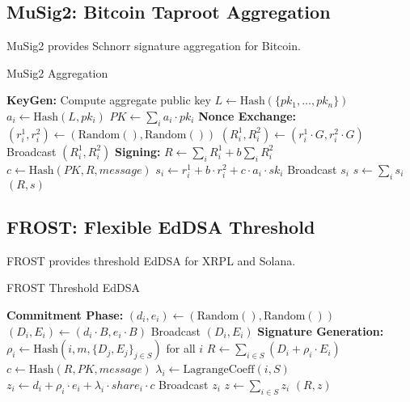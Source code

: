 \documentclass[11pt]{article}
\begin{document}
\subsection{MuSig2: Bitcoin Taproot Aggregation}

MuSig2 \cite{musig2} provides Schnorr signature aggregation for Bitcoin.

\begin{algorithm}[H]
\caption{MuSig2 Aggregation}
\begin{algorithmic}[1]
    \State \textbf{KeyGen:} Compute aggregate public key
    \State $L \gets \text{Hash}(\{pk_1, \ldots, pk_n\})$
        \State $a_i \gets \text{Hash}(L, pk_i)$
    \EndFor
    \State $PK \gets \sum_{i} a_i \cdot pk_i$
    \State
    \State \textbf{Nonce Exchange:}
        \State $(r_i^1, r_i^2) \gets (\text{Random}(), \text{Random}())$
        \State $(R_i^1, R_i^2) \gets (r_i^1 \cdot G, r_i^2 \cdot G)$
        \State Broadcast $(R_i^1, R_i^2)$
    \EndFor
    \State
    \State \textbf{Signing:}
    \State $R \gets \sum_{i} R_i^1 + b \sum_{i} R_i^2$ 
    \State $c \gets \text{Hash}(PK, R, message)$
        \State $s_i \gets r_i^1 + b \cdot r_i^2 + c \cdot a_i \cdot sk_i$
        \State Broadcast $s_i$
    \EndFor
    \State $s \gets \sum_i s_i$
    \State \Return $(R, s)$ 
\EndFunction
\end{algorithmic}
\end{algorithm}

\subsection{FROST: Flexible EdDSA Threshold}

FROST \cite{frost} provides threshold EdDSA for XRPL and Solana.

\begin{algorithm}[H]
\caption{FROST Threshold EdDSA}
\begin{algorithmic}[1]
    \State \textbf{Commitment Phase:}
        \State $(d_i, e_i) \gets (\text{Random}(), \text{Random}())$
        \State $(D_i, E_i) \gets (d_i \cdot B, e_i \cdot B)$ 
        \State Broadcast $(D_i, E_i)$
    \EndFor
    \State
    \State \textbf{Signature Generation:}
    \State $\rho_i \gets \text{Hash}(i, m, \{D_j, E_j\}_{j \in S})$ for all $i$
    \State $R \gets \sum_{i \in S} (D_i + \rho_i \cdot E_i)$
    \State $c \gets \text{Hash}(R, PK, message)$
        \State $\lambda_i \gets \text{LagrangeCoeff}(i, S)$
        \State $z_i \gets d_i + \rho_i \cdot e_i + \lambda_i \cdot share_i \cdot c$
        \State Broadcast $z_i$
    \EndFor
    \State $z \gets \sum_{i \in S} z_i$
    \State \Return $(R, z)$ 
\EndFunction
\end{algorithmic}
\end{algorithm}
\end{document}
